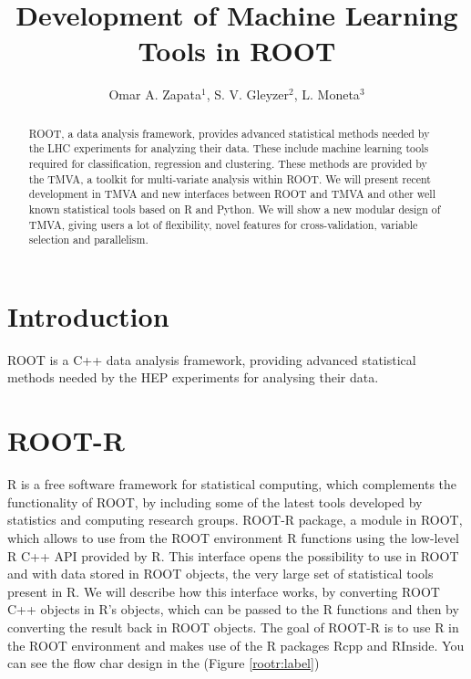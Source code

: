 \documentclass[a4paper]{jpconf}
\begin{document}
\title{Development of Machine Learning Tools in ROOT}

\author{Omar A. Zapata$^1$, S. V. Gleyzer$^2$, L. Moneta$^3$}

\address{$^1$,University of Antioquia and Metropolitan Institute of Technology, PH/STF Dep.}
\address{$^2$,University of Florida and CERN, PH/STF Dep.}
\address{$^3$,CERN, PH/STF Dep.}


\begin{abstract}
ROOT, a data analysis framework, provides advanced statistical methods needed by the LHC experiments for analyzing their data. These include machine learning tools required for classification, regression and clustering. These methods are provided by the TMVA, a toolkit for multi-variate analysis within ROOT. We will present recent development in TMVA and new interfaces between ROOT and TMVA and other well known statistical tools based on R and Python.
We will show a new modular design of TMVA, giving users a lot of flexibility, novel features for cross-validation, variable selection and parallelism.
\end{abstract}

\section{Introduction}
ROOT is  a C++ data analysis framework, providing advanced statistical methods needed by the HEP experiments for analysing their data. 

\section{ROOT-R}
R is a free software framework for statistical computing, which complements the functionality of ROOT, by including some of the latest tools developed by statistics and computing research groups. 
ROOT-R package, a module in ROOT, which allows to use from the ROOT environment R functions using the low-level R C++ API provided by R. 
This interface opens the possibility to use in ROOT and with data stored in ROOT objects, the very large set of statistical tools present in  R. 
We will describe how this interface works, by converting ROOT C++ objects in R’s objects, which can be passed to the  R functions and then by converting the result back in ROOT objects. 
The goal of ROOT-R is to use R in the ROOT environment and makes use of the R packages Rcpp and RInside.
You can see the flow char design in the (Figure \ref{rootr:label})
\end{document}
